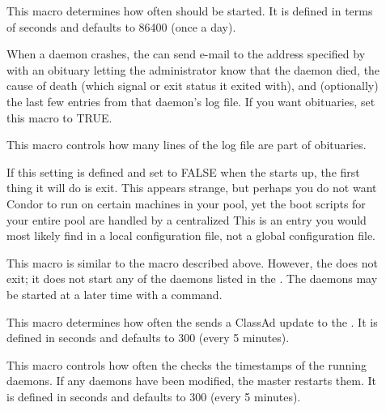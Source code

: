 \begin{description}
\item[] \label{param:PreenInterval} This macro
  determines how often  should be started.  It is
  defined in terms of seconds and defaults to 86400 (once a day).

\item[] \label{param:PublishObituaries}
  When a daemon crashes, the  can send e-mail to the
  address specified by  with an obituary letting
  the administrator know that the daemon died, the cause of
  death (which signal or exit status it exited with), and
  (optionally) the last few entries from that daemon's log file.  If
  you want obituaries, set this macro to TRUE.

\item[] \label{param:ObituaryLogLength}
  This macro controls how many lines
  of the log file are part of obituaries.

\item[] \label{param:StartMaster} If this setting
  is defined and set to FALSE when the  starts up, the first
  thing it will do is exit.  This appears strange, but perhaps you
  do not want Condor to run on certain machines in your pool, yet
  the boot scripts for your entire pool are handled by a centralized
  This is
  an entry you would most likely find in a local configuration file,
  not a global configuration file.

\item[] \label{param:StartDaemons} This macro
  is similar to the  macro described above.
  However, the  does not exit; it does not start any
  of the daemons listed in the .
  The daemons may be started at a later time with a 
  command.

\item[]
  \label{param:MasterUpdateInterval} This macro determines how often
  the  sends a ClassAd update to the
  .  It is defined in seconds and defaults to 300
  (every 5 minutes).
  
\item[]
  \label{param:MasterCheckNewExecInterval} This
  macro controls how often the  checks the timestamps
  of the running daemons.  If any daemons have been modified, the
  master restarts them.  It is defined in seconds and defaults to 300
  (every 5 minutes).


\end{description}
